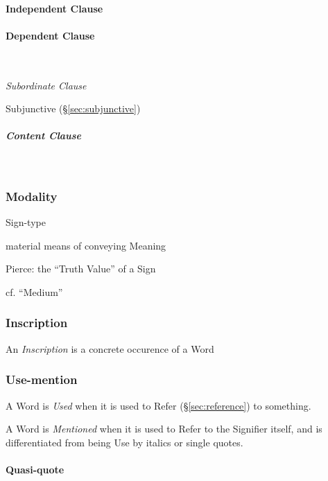 \paragraph{Independent Clause}\label{sec:independent_clause}\hfill

\paragraph{Dependent Clause}\label{sec:dependent_clause}\hfill \\\hfill

\emph{Subordinate Clause}

Subjunctive (\S\ref{sec:subjunctive})

\subparagraph{Content Clause}\label{sec:content_clause}\hfill \\\hfill



\subsubsection{Modality}\label{sec:syntax_modality}

Sign-type

material means of conveying Meaning

Pierce: the ``Truth Value'' of a Sign

cf. ``Medium''




\subsubsection{Inscription}\label{sec:inscription}

An \emph{Inscription} is a concrete occurence of a Word



\subsubsection{Use-mention}\label{sec:use_mention}

A Word is \emph{Used} when it is used to Refer (\S\ref{sec:reference})
to something.

A Word is \emph{Mentioned} when it is used to Refer to the Signifier
itself, and is differentiated from being Use by italics or single
quotes.



\paragraph{Quasi-quote}\label{sec:quasi_quote}\hfill

